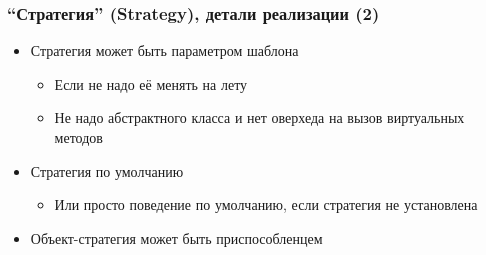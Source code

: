 \documentclass[xetex,mathserif,serif]{beamer}
\begin{document}
    \begin{frame}
        \frametitle{``Стратегия'' (Strategy), детали реализации (2)}
        \begin{itemize}
            \item Стратегия может быть параметром шаблона
            \begin{itemize}
                \item Если не надо её менять на лету
                \item Не надо абстрактного класса и нет оверхеда на вызов виртуальных методов
            \end{itemize}
            \item Стратегия по умолчанию
            \begin{itemize}
                \item Или просто поведение по умолчанию, если стратегия не установлена
            \end{itemize}
            \item Объект-стратегия может быть приспособленцем
        \end{itemize}
    \end{frame}
\end{document}
